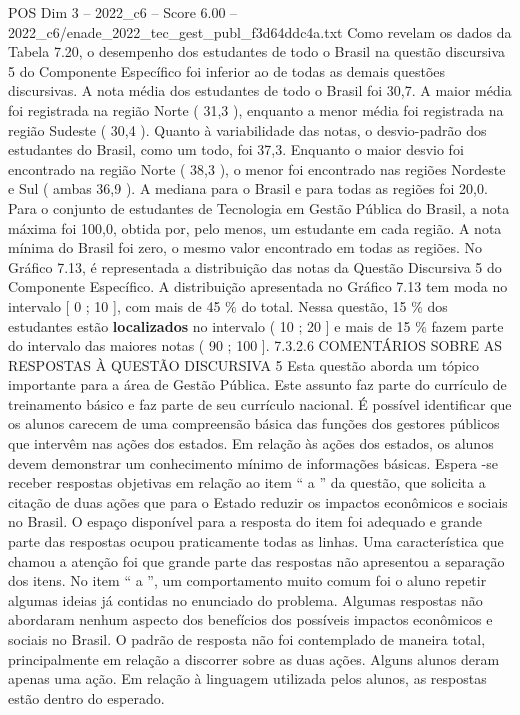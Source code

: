 \begin{textsample}{POS Dim 3 – 2022\_c6 – Score 6.00 – 2022\_c6/enade\_2022\_tec\_gest\_publ\_f3d64ddc4a.txt}
Como revelam os dados da Tabela 7.20, o desempenho dos estudantes de todo o Brasil na questão discursiva 5 do Componente Específico foi inferior ao de todas as demais questões discursivas.
A nota média dos estudantes de todo o Brasil foi 30,7.
A maior média foi registrada na região Norte ( 31,3 ), enquanto a menor média foi registrada na região Sudeste ( 30,4 ).
Quanto à variabilidade das notas, o desvio-padrão dos estudantes do Brasil, como um todo, foi 37,3.
Enquanto o maior desvio foi encontrado na região Norte ( 38,3 ), o menor foi encontrado nas regiões Nordeste e Sul ( ambas 36,9 ).
A mediana para o Brasil e para todas as regiões foi 20,0.
Para o conjunto de estudantes de Tecnologia em Gestão Pública do Brasil, a nota máxima foi 100,0, obtida por, pelo menos, um estudante em cada região.
A nota mínima do Brasil foi zero, o mesmo valor encontrado em todas as regiões.
No Gráfico 7.13, é representada a distribuição das notas da Questão Discursiva 5 do Componente Específico.
A distribuição apresentada no Gráfico 7.13 tem moda no intervalo [ 0 ; 10 ], com mais de 45 \% do total.
Nessa questão, 15 \% dos estudantes estão \textbf{localizados} no intervalo ( 10 ; 20 ] e mais de 15 \% fazem parte do intervalo das maiores notas ( 90 ; 100 ]. 7.3.2.6 COMENTÁRIOS SOBRE AS RESPOSTAS À QUESTÃO DISCURSIVA 5 Esta questão aborda um tópico importante para a área de Gestão Pública.
Este assunto faz parte do currículo de treinamento básico e faz parte de seu currículo nacional.
É possível identificar que os alunos carecem de uma compreensão básica das funções dos gestores públicos que intervêm nas ações dos estados.
Em relação às ações dos estados, os alunos devem demonstrar um conhecimento mínimo de informações básicas.
Espera -se receber respostas objetivas em relação ao item “ a ” da questão, que solicita a citação de duas ações que para o Estado reduzir os impactos econômicos e sociais no Brasil.
O espaço disponível para a resposta do item foi adequado e grande parte das respostas ocupou praticamente todas as linhas.
Uma característica que chamou a atenção foi que grande parte das respostas não apresentou a separação dos itens.
No item “ a ”, um comportamento muito comum foi o aluno repetir algumas ideias já contidas no enunciado do problema.
Algumas respostas não abordaram nenhum aspecto dos benefícios dos possíveis impactos econômicos e sociais no Brasil.
O padrão de resposta não foi contemplado de maneira total, principalmente em relação a discorrer sobre as duas ações.
Alguns alunos deram apenas uma ação.
Em relação à linguagem utilizada pelos alunos, as respostas estão dentro do esperado.

\end{textsample}
